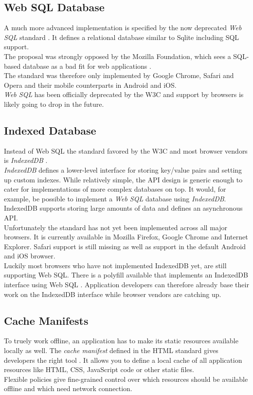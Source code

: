 \subsection{Web SQL Database}
A much more advanced implementation is specified by the now deprecated \emph{Web SQL} standard \cite{websql}. It defines a relational database similar to Sqlite including SQL support.\\
The proposal was strongly opposed by the Mozilla Foundation, which sees a SQL-based database as a bad fit for web applications \cite{mozilla_indexeddb}.\\
The standard was therefore only implemented by Google Chrome, Safari and Opera and their mobile counterparts in Android and iOS.\\
\emph{Web SQL} has been officially deprecated by the W3C and support by browsers is likely going to drop in the future.

\subsection{Indexed Database}
Instead of Web SQL the standard favored by the W3C and most browser vendors is \emph{IndexedDB} \cite{indexeddb}.\\
\emph{IndexedDB} defines a lower-level interface for storing key/value pairs and setting up custom indexes.
While relatively simple, the API design is generic enough to cater for implementations of more complex databases on top.
It would, for example, be possible to implement a \emph{Web SQL} database using \emph{IndexedDB}.\\
IndexedDB supports storing large amounts of data and defines an asynchronous API.\\
Unfortunately the standard has not yet been implemented across all major browsers.
It is currently available in Mozilla Firefox, Google Chrome and Internet Explorer.
Safari support is still missing as well as support in the default Android and iOS browser.\\
Luckily most browsers who have not implemented IndexedDB yet, are still supporting Web SQL.
There is a polyfill available that implements an IndexedDB interface using Web SQL \cite{indexeddb_polyfill}. Application developers can therefore already base their work on the IndexedDB interface while browser vendors are catching up.

\subsection{Cache Manifests}
To truely work offline, an application has to make its static resources available locally as well.
The \emph{cache manifest} defined in the HTML standard gives developers the right tool \cite{cache_manifests}. It allows you to define a local cache of all application resources like HTML, CSS, JavaScript code or other static files.\\
Flexible policies give fine-grained control over which resources should be available offline and which need network connection.
